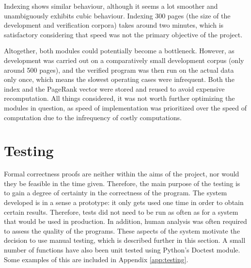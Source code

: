 \documentclass[12pt,a4paper,notitlepage,twoside]{scrbook}
\begin{document}
Indexing shows similar behaviour, although it seems a lot smoother and unambiguously exhibits cubic
behaviour. Indexing 300 pages (the size of the development and verification corpora) takes around two minutes, which is satisfactory considering
that speed was not the primary objective of the project.

Altogether, both modules could potentially become a bottleneck. However, as development
was carried out on a comparatively small development corpus (only around 500 pages), and
the verified program was then run on the actual data only once, which means the slowest operating cases
were infrequent. Both the index and the PageRank vector were stored and reused to avoid
expensive recomputation. All things considered, it was not worth further optimizing the
modules in question, as speed of implementation was prioritized over the speed of
computation due to the infrequency of costly computations. 

\section{Testing}
\label{sec:testing}
Formal correctness proofs are neither within the aims of the project, nor would they be
feasible in the time given. Therefore, the main purpose of the testing is to gain a degree
of certainty in the correctness of the program. The system developed is in a sense a
prototype: it only gets used one time in order to obtain certain results. Therefore, tests
did not need to be run as often as for a system that would be used in production. In
addition, human analysis was often required to assess the quality of the programs. These
aspects of the system motivate the decision to use manual testing, which is described
further in this section. 
A small number of functions have also been unit tested using Python's Doctest module. Some
examples of this are included in Appendix \ref{app:testing}.
\end{document}
